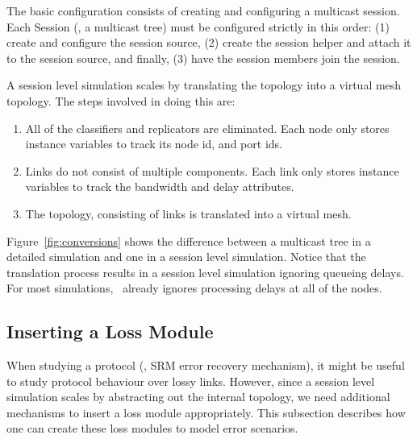 The basic configuration consists of creating and configuring
a  multicast session.
Each Session (\ie, a multicast tree) must be configured strictly in
this order:
(1) create and configure the session source,
(2) create the session helper and attach it to the session source, and
finally, (3) have the session members join the session.
A session level simulation scales by translating the topology
into a virtual mesh topology.
The steps involved in doing this are:
\begin{enumerate}\itemsep0pt
\item All of the classifiers and replicators are eliminated.
  Each node only stores instance variables to track its node id, and port ids.
\item Links do not consist of multiple components.
  Each link only stores instance variables to track the bandwidth and delay attributes.
\item The topology, consisting of links is translated into a virtual mesh.
\end{enumerate}
Figure~\ref{fig:conversions} shows the difference between a
multicast tree in a detailed simulation and one in a session level simulation.
Notice that the translation process results in a session level simulation
ignoring queueing delays.
For most simulations, \ns\ already ignores processing delays at all of the nodes.

\subsection{Inserting a Loss Module}
\label{sec:loss-config}

When studying a protocol (\eg, SRM error recovery mechanism), 
it might be useful to study protocol behaviour over lossy links.
However, since a session level simulation scales by abstracting 
out the internal topology,
we need additional mechanisms to insert a loss module appropriately.
This subsection describes how one can create these loss modules to
model error scenarios.


